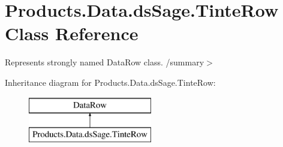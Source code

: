 \hypertarget{class_products_1_1_data_1_1ds_sage_1_1_tinte_row}{}\section{Products.\+Data.\+ds\+Sage.\+Tinte\+Row Class Reference}
\label{class_products_1_1_data_1_1ds_sage_1_1_tinte_row}


Represents strongly named Data\+Row class. /summary$>$  


Inheritance diagram for Products.\+Data.\+ds\+Sage.\+Tinte\+Row\+:\begin{figure}[H]
\begin{center}
\leavevmode
\includegraphics[height=2.000000cm]{class_products_1_1_data_1_1ds_sage_1_1_tinte_row}
\end{center}
\end{figure}
